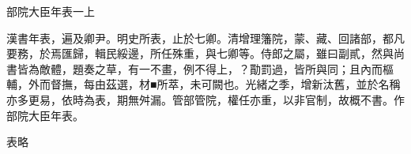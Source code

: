
\begin{pinyinscope}
部院大臣年表一上

漢書年表，遍及卿尹。明史所表，止於七卿。清增理籓院，蒙、藏、回諸部，都凡要務，於焉匯歸，輯民綏邊，所任殊重，與七卿等。侍郎之屬，雖曰副貳，然與尚書皆為敵體，題奏之草，有一不畫，例不得上，？勩罰過，皆所與同；且內而樞輔，外而督撫，每由茲選，材■所萃，未可闕也。光緒之季，增新汰舊，並於名稱亦多更易，依時為表，期無舛漏。管部管院，權任亦重，以非官制，故概不書。作部院大臣年表。

表略


\end{pinyinscope}
